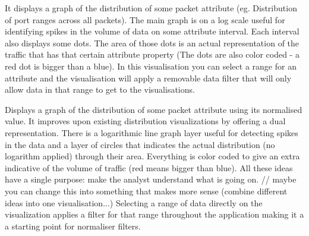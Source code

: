 It displays a graph of the distribution of some packet attribute (eg. Distribution of port ranges across all packets). 
The main graph is on a log scale useful for identifying spikes in the volume of data on some attribute interval. 
Each interval also displays some dots. The area of those dots is an actual representation of the traffic that has that certain attribute property (The dots are also color coded - a red dot is bigger than a blue). 
In this visualisation you can select a range for an attribute and the visualisation will apply a removable data filter that will only allow data in that range to get to the visualisations.

Displays a graph of the distribution of some packet attribute using its normalised value.
It improves upon existing distribution visualizations by offering a dual representation.
There is a logarithmic line graph layer useful for detecting spikes in the data and a layer of circles that indicates the actual distribution (no logarithm applied) through their area. 
Everything is color coded to give an extra indicative of the volume of traffic (red means bigger than blue).
All these ideas have a single purpose: make the analyst understand what is going on. // maybe you can change this into something that makes more sense (combine different ideas into one visualisation...)
Selecting a range of data directly on the visualization applies a filter for that range throughout the application making it a a starting point for normaliser filters. 
